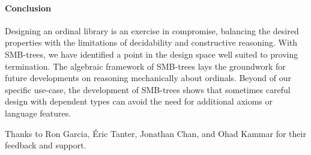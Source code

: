 \paragraph{Conclusion}
Designing an ordinal library is an exercise in compromise, balancing the desired properties
with the limitations of decidability and constructive reasoning.
With SMB-trees, we have identified a point in the design space
well suited to proving termination. The algebraic framework of SMB-trees
lays the groundwork for future developments on reasoning mechanically
about ordinals. Beyond of our specific use-case, the development of
SMB-trees shows that sometimes careful design with dependent types
can avoid the need for additional axioms or language features.

\begin{acks}
  Thanks to Ron Garcia, \'Eric Tanter, Jonathan Chan, and Ohad Kammar for their feedback and support.
\end{acks}
